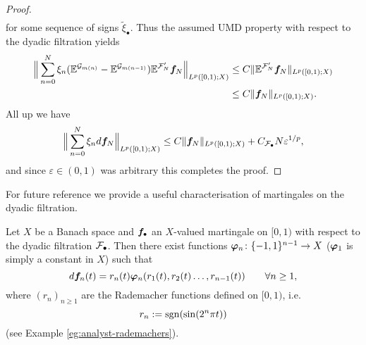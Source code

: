 \begin{proof}
\begin{equation*}
\begin{aligned}
    \end{aligned}
  \end{equation*}
  for some sequence of signs $\tilde{\xi}_{\bullet}$.
  Thus the assumed UMD property with respect to the dyadic filtration yields
  \begin{equation*}
    \begin{aligned}
      \Big\| \sum_{n=0}^{N} \xi_{n} (\mathbb{E}^{\mathcal{G}_{m(n)}} - \mathbb{E}^{\mathcal{G}_{m(n-1)}}) \mathbb{E}^{\mathcal{F}'_{N}} \bm{f}_{N} \Big\|_{L^p([0,1);X)}
      &\leq C \|\mathbb{E}^{\mathcal{F}'_{N}} \bm{f}_{N}\|_{L^p([0,1);X)} \\
      &\leq C\|\bm{f}_{N}\|_{L^p([0,1);X)}.
    \end{aligned}
    \end{equation*}
    All up we have
    \begin{equation*}
      \Big\| \sum_{n=0}^{N} \xi_{n} d\bm{f}_{N} \Big\|_{L^p([0,1);X)} \leq C\|\bm{f}_{N}\|_{L^p([0,1);X)} + C_{\mathcal{F}_{\bullet}} N \varepsilon^{1/p},
    \end{equation*}
    and since $\varepsilon \in (0,1)$ was arbitrary this completes the proof.
  \end{proof}

  For future reference we provide a useful characterisation of martingales on the dyadic filtration.

  \begin{prop}\label{prop:PW-martingales}
    Let $X$ be a Banach space and $\bm{f}_{\bullet}$ an $X$-valued martingale on $[0,1)$ with respect to the dyadic filtration $\mathcal{F}_{\bullet}$.
    Then there exist functions $\bm{\varphi}_{n} \colon \{-1,1\}^{n-1} \to X$ ($\bm{\varphi}_{1}$ is simply a constant in $X$) such that
    \begin{equation*}
      d\bm{f}_{n}(t) = r_{n}(t) \bm{\varphi}_{n}(r_1(t), r_{2}(t)\ldots, r_{n-1}(t)) \qquad \forall n \geq 1,
    \end{equation*}
    where $(r_{n})_{n \geq 1}$ are the Rademacher functions defined on $[0,1)$, i.e.
    \begin{equation*}
      r_{n} := \operatorname{sgn}(\sin(2^n \pi t))
    \end{equation*}
    (see Example \ref{eg:analyst-rademachers}).
  \end{prop}

